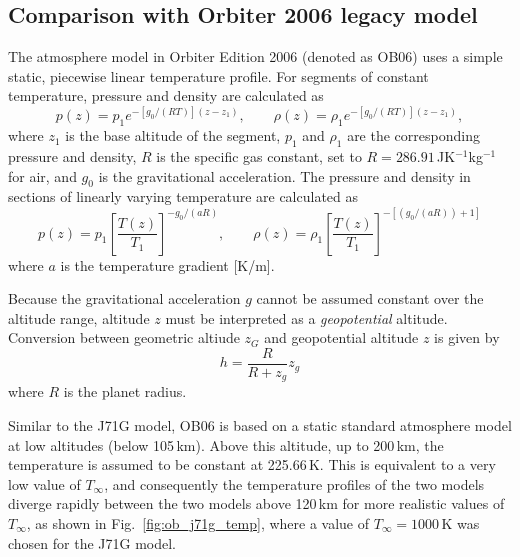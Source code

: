 \documentclass[Orbiter Technical Reference.tex]{subfiles}
\begin{document}
\subsection{Comparison with Orbiter 2006 legacy model}
The atmosphere model in Orbiter Edition 2006 (denoted as OB06) uses a simple static, piecewise linear temperature profile. For segments of constant temperature, pressure and density are calculated as
\begin{equation}
p(z)=p_1 e^{-[g_0/(RT)](z-z_1)}, \qquad \rho(z)=\rho_1 e^{-[g_0/(RT)](z-z_1)},
\end{equation}
where $z_1$ is the base altitude of the segment, $p_1$ and $\rho_1$ are the corresponding pressure and density, $R$ is the specific gas constant, set to $R=286.91$\,JK$^{-1}$kg$^{-1}$ for air, and $g_0$ is the gravitational acceleration.
The pressure and density in sections of linearly varying temperature are calculated as
\begin{equation}
p(z)=p_1\left[\frac{T(z)}{T_1}\right]^{-g_0/(aR)},\qquad
\rho(z)=\rho_1\left[\frac{T(z)}{T_1}\right]^{-[(g_0/(aR))+1]}
\end{equation}
where $a$ is the temperature gradient [K/m].

Because the gravitational acceleration $g$ cannot be assumed constant over the altitude range, altitude $z$ must be interpreted as a \emph{geopotential} altitude. Conversion between geometric altiude $z_G$ and geopotential altitude $z$ is given by
\begin{equation}
h = \frac{R}{R+z_g}z_g
\end{equation}
where $R$ is the planet radius.

Similar to the J71G model, OB06 is based on a static standard atmosphere model at low altitudes (below 105\,km). Above this altitude, up to 200\,km, the temperature is assumed to be constant at 225.66\,K. This is equivalent to a very low value of $T_\infty$, and consequently the temperature profiles of the two models diverge rapidly between the two models above 120\,km for more realistic values of $T_\infty$, as shown in Fig.~\ref{fig:ob_j71g_temp}, where a value of $T_\infty=1000$\,K was chosen for the J71G model.
\end{document}

